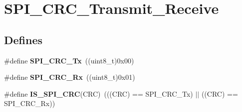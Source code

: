 \hypertarget{group__SPI__CRC__Transmit__Receive}{
\section{SPI\_\-CRC\_\-Transmit\_\-Receive}
\label{group__SPI__CRC__Transmit__Receive}
}
\subsection*{Defines}
\begin{DoxyCompactItemize}
\item 
\hypertarget{group__SPI__CRC__Transmit__Receive_ga7b5cd97c9323e491b628fd3a7be9e133}{
\#define {\bfseries SPI\_\-CRC\_\-Tx}~((uint8\_\-t)0x00)}
\label{group__SPI__CRC__Transmit__Receive_ga7b5cd97c9323e491b628fd3a7be9e133}

\item 
\hypertarget{group__SPI__CRC__Transmit__Receive_gaf68380273616efbbc2dc9a420f1c641b}{
\#define {\bfseries SPI\_\-CRC\_\-Rx}~((uint8\_\-t)0x01)}
\label{group__SPI__CRC__Transmit__Receive_gaf68380273616efbbc2dc9a420f1c641b}

\item 
\hypertarget{group__SPI__CRC__Transmit__Receive_ga31fe242594f851558496a93f85def883}{
\#define {\bfseries IS\_\-SPI\_\-CRC}(CRC)~(((CRC) == SPI\_\-CRC\_\-Tx) $|$$|$ ((CRC) == SPI\_\-CRC\_\-Rx))}
\label{group__SPI__CRC__Transmit__Receive_ga31fe242594f851558496a93f85def883}

\end{DoxyCompactItemize}
